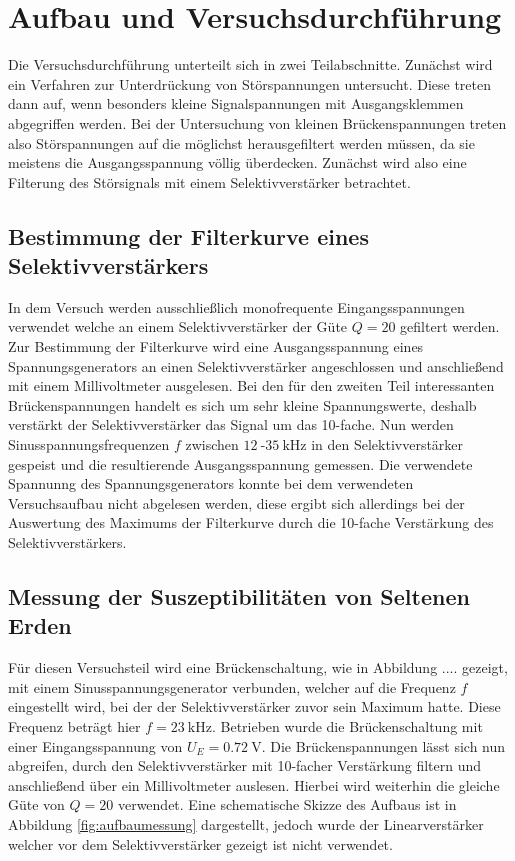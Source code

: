 \section{Aufbau und Versuchsdurchführung}

Die Versuchsdurchführung unterteilt sich in zwei Teilabschnitte. Zunächst wird ein Verfahren zur Unterdrückung von Störspannungen untersucht. Diese treten dann auf, wenn besonders kleine Signalspannungen mit Ausgangsklemmen abgegriffen werden.
Bei der Untersuchung von kleinen Brückenspannungen treten also Störspannungen auf die möglichst herausgefiltert werden müssen, da sie meistens die Ausgangsspannung völlig überdecken. Zunächst wird also eine Filterung des Störsignals mit
einem Selektivverstärker betrachtet.

\subsection{Bestimmung der Filterkurve eines Selektivverstärkers}
In dem Versuch werden ausschließlich monofrequente Eingangsspannungen verwendet welche an einem Selektivverstärker der Güte $Q = 20$ gefiltert werden. Zur Bestimmung der Filterkurve wird eine Ausgangsspannung eines Spannungsgenerators 
an einen Selektivverstärker angeschlossen und anschließend mit einem Millivoltmeter ausgelesen. 
Bei den für den zweiten Teil interessanten Brückenspannungen handelt es sich um sehr kleine Spannungswerte, deshalb verstärkt der Selektivverstärker das Signal um das 10-fache.
Nun werden Sinusspannungsfrequenzen $f$ zwischen $\SI{12}{}$-$\SI{35}{\kilo\hertz}$ in den Selektivverstärker gespeist und die resultierende Ausgangsspannung gemessen.
Die verwendete Spannunng des Spannungsgenerators konnte bei dem verwendeten Versuchsaufbau nicht abgelesen werden, diese ergibt sich allerdings bei der Auswertung des Maximums der Filterkurve durch die 10-fache Verstärkung des Selektivverstärkers.

\subsection{Messung der Suszeptibilitäten von Seltenen Erden} 
Für diesen Versuchsteil wird eine Brückenschaltung, wie in Abbildung .... gezeigt, mit einem Sinusspannungsgenerator verbunden, welcher auf die Frequenz $f$ eingestellt wird, bei der der Selektivverstärker zuvor sein Maximum hatte. Diese Frequenz beträgt hier $f = \SI{23}{\kilo\hertz}$.
Betrieben wurde die Brückenschaltung mit einer Eingangsspannung von $U_{E} = \SI{0.72}{\volt}$. Die Brückenspannungen lässt sich nun abgreifen, durch den Selektivverstärker mit 10-facher Verstärkung filtern und anschließend über ein Millivoltmeter auslesen. Hierbei wird weiterhin die gleiche Güte von $Q = 20$ verwendet.
Eine schematische Skizze des Aufbaus ist in Abbildung \ref{fig:aufbaumessung} dargestellt, jedoch wurde der Linearverstärker welcher vor dem Selektivverstärker gezeigt ist nicht verwendet.

